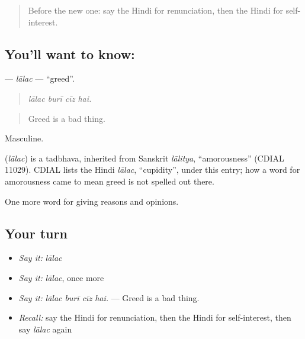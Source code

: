 \label{lesson:HI-C358-lalac}



\begin{quote}
Before the new one: say the Hindi for renunciation, then the Hindi for self-interest.
\end{quote}

\subsection*{You'll want to know: }
\textbf{} — \emph{lālac} — \textquotedblleft{}greed\textquotedblright{}.

\begin{quote}
   
\end{quote}

\begin{quote}
\emph{lālac burī cīz hai.}
\end{quote}

\begin{quote}
Greed is a bad thing.
\end{quote}

Masculine.

\begin{cousinweb}
\textbf{} (\emph{lālac}) is a tadbhava, inherited from Sanskrit \emph{lālitya}, \textquotedblleft{}amorousness\textquotedblright{} (CDIAL 11029). CDIAL lists the Hindi \emph{lālac}, \textquotedblleft{}cupidity\textquotedblright{}, under this entry; how a word for amorousness came to mean greed is not spelled out there.
\end{cousinweb}

\begin{grammarlens}[title={What you've built}]
One more word for giving reasons and opinions.
\end{grammarlens}

\subsection*{Your turn}
\begin{itemize}
\raggedright
  \item \emph{Say it:} \emph{lālac}
  \item \emph{Say it:} \emph{lālac}, once more
  \item \emph{Say it:} \emph{lālac burī cīz hai.} — Greed is a bad thing.
  \item \emph{Recall:} say the Hindi for renunciation, then the Hindi for self-interest, then say \emph{lālac} again
\end{itemize}

